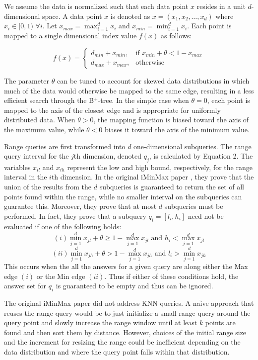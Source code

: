 \documentclass[conference]{IEEEtran}
\begin{document}
We assume the data is normalized such that each data point $x$ resides in a unit $d$-dimensional space. A data point $x$ is denoted as $x=(x_1,x_2,\ldots,x_d)$ where $x_i \in [0,1)$ $\forall i$. Let $x_{max} = \max_{i=1}^d x_i$ and $x_{min} = \min_{i=1}^d x_i$. Each point is mapped to a single dimensional index value $f(x)$ as follows:

\begin{equation}
f(x) =
\begin{cases}
d_{min} + x_{min}, & \text{if } x_{min} + \theta < 1 - x_{max} \\
d_{max} + x_{max}, & \text{otherwise}
\end{cases}
\end{equation}

The parameter $\theta$ can be tuned to account for skewed data distributions in which much of the data would otherwise be mapped to the same edge, resulting in a less efficient search through the B$^+$-tree. In the simple case when $\theta = 0$, each point is mapped to the axis of the closest edge and is appropriate for uniformly distributed data. When $\theta > 0$, the mapping function is biased toward the axis of the maximum value, while $\theta < 0$ biases it toward the axis of the minimum value.

Range queries are first transformed into $d$ one-dimensional subqueries. The range query interval for the $j$th dimension, denoted $q_j$, is calculated by Equation 2. The variables $x_{il}$ and $x_{ih}$ represent the low and high bound, respectively, for the range interval in the $i$th dimension. In the original iMinMax paper \cite{Ooi:2000:IES:335168.335219}, they prove that the union of the results from the $d$ subqueries is guaranteed to return the set of all points found within the range, while no smaller interval on the subqueries can guarantee this. Moreover, they prove that at most $d$ subqueries must be performed. In fact, they prove that a subquery $q_i = [l_i, h_i]$ need not be evaluated if one of the following holds:
\[(i) \min_{j=1}^d x_{jl} + \theta \geq 1 - \max_{j=1}^d x_{jl} \text{ and } h_i < \max_{j=1}^d x_{jl} \]
\[(ii) \min_{j=1}^d x_{jh} + \theta > 1 - \max_{j=1}^d x_{jh} \text{ and } l_i > \min_{j=1}^d x_{jh} \]
This occurs when the all the answers for a given query are along either the Max edge $(i)$ or the Min edge $(ii)$. Thus if either of these conditions hold, the answer set for $q_i$ is guaranteed to be empty and thus can be ignored.

The original iMinMax paper did not address KNN queries. A na$\ddot{\text{i}}$ve approach that reuses the range query would be to just initialize a small range query around the query point and slowly increase the range window until at least $k$ points are found and then sort them by distance. However, choices of the initial range size and the increment for resizing the range could be inefficient depending on the data distribution and where the query point falls within that distribution.
\end{document}
